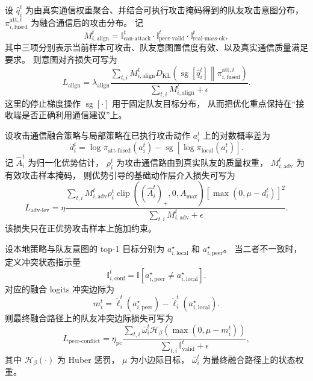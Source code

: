 
设 \(\hat{q}_i^t\) 为由真实通信权重聚合、并结合可执行攻击掩码得到的队友攻击意图分布，
\(\pi_{i,\text{fused}}^{\text{att},t}\) 为融合通信后的攻击分布。
记
\begin{equation}
M_{i,\text{align}}^t
=
\mathbb{I}_{\text{can-attack}}^t
\cdot
\mathbb{I}_{\text{peer-valid}}^t
\cdot
\mathbb{I}_{\text{real-mass-ok}}^t ,
\end{equation}
其中三项分别表示当前样本可攻击、队友意图置信度有效、以及真实通信质量满足要求。
则意图对齐损失可写为
\begin{equation}
L_{\text{align}}
=
\lambda_{\text{align}}
\frac{
\sum_{t,i}
M_{i,\text{align}}^t
D_{\mathrm{KL}}
\left(
\operatorname{sg}[\hat{q}_i^t]
\middle\|
\pi_{i,\text{fused}}^{\text{att},t}
\right)
}{
\sum_{t,i} M_{i,\text{align}}^t + \epsilon
}.
\end{equation}
这里的停止梯度操作 \(\operatorname{sg}[\cdot]\) 用于固定队友目标分布，
从而把优化重点保持在“接收端是否正确利用通信建议”上。


设攻击通信融合策略与局部策略在已执行攻击动作 \(a_i^t\) 上的对数概率差为
\begin{equation}
d_i^t
=
\log \pi_{\text{att-fused}}(a_i^t)
-
\operatorname{sg}\!\left[
\log \pi_{\text{local}}(a_i^t)
\right].
\end{equation}
记 \(\hat{A}_i^t\) 为归一化优势估计，
\(\rho_i^t\) 为攻击通信路由到真实队友的质量权重，
\(M_{i,\text{adv}}^t\) 为有效攻击样本掩码，
则优势引导的基础动作层介入损失可写为
\begin{equation}
L_{\text{adv-lev}}
=
\eta
\frac{
\sum_{t,i}
M_{i,\text{adv}}^t
\rho_i^t
\operatorname{clip}\!\left((\hat{A}_i^t)_+,0,A_{\max}\right)
\left[
\max(0,\mu-d_i^t)
\right]^2
}{
\sum_{t,i} M_{i,\text{adv}}^t + \epsilon
}.
\end{equation}
该损失只在正优势攻击样本上施加约束。


设本地策略与队友意图的 top-1 目标分别为
\(a_{i,\text{local}}^\star\) 和 \(a_{i,\text{peer}}^\star\)。
当二者不一致时，
定义冲突状态指示量
\begin{equation}
\mathbb{I}_{i,\text{conf}}^t
=
\mathbb{I}
\left[
a_{i,\text{peer}}^\star
\neq
a_{i,\text{local}}^\star
\right].
\end{equation}
对应的融合 logits 冲突边际为
\begin{equation}
m_i^t
=
\tilde{\ell}_i^t(a_{i,\text{peer}}^\star)
-
\tilde{\ell}_i^t(a_{i,\text{local}}^\star).
\end{equation}
则最终融合路径上的队友冲突边际损失可写为
\begin{equation}
L_{\text{peer-conflict}}
=
\eta_{\text{pc}}
\frac{
\sum_{t,i}
\bar{\omega}_i^t
\mathcal{H}_{\beta}
\left(
\max(0,\mu-m_i^t)
\right)
}{
\sum_{t,i}\mathbb{I}_{\text{valid}}^t + \epsilon
},
\end{equation}
其中 \(\mathcal{H}_{\beta}(\cdot)\) 为 Huber 惩罚，
\(\mu\) 为小边际目标，
\(\bar{\omega}_i^t\) 为最终融合路径上的状态权重。

